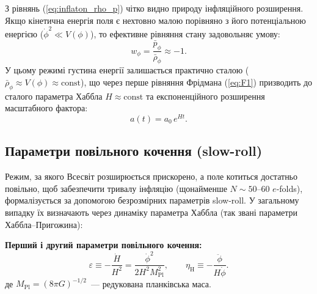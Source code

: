 \documentclass[12pt, a4paper]{article}
\begin{document}
З рівнянь (\ref{eq:inflaton_rho_p}) чітко видно природу інфляційного розширення. Якщо кінетична енергія поля є нехтовно малою порівняно з його потенціальною енергією ($\dot{\phi}^2 \ll V(\phi)$), то ефективне рівняння стану задовольняє умову:
\begin{equation*}
  w_\phi = \frac{\bar{p}_\phi}{\bar{\rho}_\phi} \approx -1.
\end{equation*}
У цьому режимі густина енергії залишається практично сталою ($\bar{\rho}_\phi \approx V(\phi) \approx \text{const}$), що через перше рівняння Фрідмана (\ref{eq:F1}) призводить до сталого параметра Хаббла $H \approx \text{const}$ та експоненційного розширення масштабного фактора:
\begin{equation*}
  a(t) = a_0 \, e^{Ht}.
\end{equation*}

\subsection{Параметри повільного кочення (slow-roll)}

Режим, за якого Всесвіт розширюється прискорено, а поле котиться достатньо повільно, щоб забезпечити тривалу інфляцію (щонайменше $N \sim 50$--$60$ $e$-folds), формалізується за допомогою безрозмірних параметрів slow-roll. У загальному випадку їх визначають через динаміку параметра Хаббла (так звані параметри Хаббла--Пригожина):

\begin{keybox}
\textbf{Перший і другий параметри повільного кочення:}
\begin{equation}\label{eq:slow_roll_def}
  \varepsilon \equiv -\frac{\dot H}{H^2} = \frac{\dot\phi^2}{2H^2 M_\mathrm{Pl}^2},
  \qquad
  \eta_\mathrm{H} \equiv -\frac{\ddot{\phi}}{H\dot{\phi}}.
\end{equation}
де $M_\mathrm{Pl} = (8\pi G)^{-1/2}$~--- редукована планківська маса.
\end{keybox}
\end{document}
